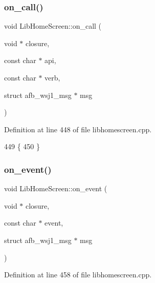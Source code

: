 \subsubsection{\texorpdfstring{on\+\_\+call()}{on\_call()}}
{\footnotesize\ttfamily void Lib\+Home\+Screen\+::on\+\_\+call (\begin{DoxyParamCaption}\item[{void $\ast$}]{closure,  }\item[{const char $\ast$}]{api,  }\item[{const char $\ast$}]{verb,  }\item[{struct afb\+\_\+wsj1\+\_\+msg $\ast$}]{msg }\end{DoxyParamCaption})}



Definition at line 448 of file libhomescreen.\+cpp.


\begin{DoxyCode}
449 \{
450 \}
\end{DoxyCode}
\mbox{\label{class_lib_home_screen_a9c4885b51b43ab24a548d49fb3ab2de3}} 
\subsubsection{\texorpdfstring{on\+\_\+event()}{on\_event()}}
{\footnotesize\ttfamily void Lib\+Home\+Screen\+::on\+\_\+event (\begin{DoxyParamCaption}\item[{void $\ast$}]{closure,  }\item[{const char $\ast$}]{event,  }\item[{struct afb\+\_\+wsj1\+\_\+msg $\ast$}]{msg }\end{DoxyParamCaption})}



Definition at line 458 of file libhomescreen.\+cpp.


